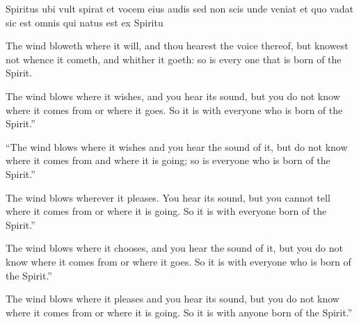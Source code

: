			\begin{framed}
			\scriptsize
				\begin{compactdesc}
					\item[SBLG]  \hyperref[PNEUMA]{} 
					\item[BSV] Spiritus ubi vult spirat et vocem eius audis sed non scis unde veniat et quo vadat sic est omnis qui natus est ex Spiritu
					\item[ASV] The wind bloweth where it will, and thou hearest the voice thereof, but knowest not whence it cometh, and whither it goeth: so is every one that is born of the Spirit.
					\item[ESV] The wind blows where it wishes, and you hear its sound, but you do not know where it comes from or where it goes. So it is with everyone who is born of the Spirit.''
					\item[NASB] ``The wind blows where it wishes and you hear the sound of it, but do not know where it comes from and where it is going; so is everyone who is born of the Spirit.''
					\item[NIV] The wind blows wherever it pleases. You hear its sound, but you cannot tell where it comes from or where it is going. So it is with everyone born of the Spirit.''
					\item[NRSV] The wind blows where it chooses, and you hear the sound of it, but you do not know where it comes from or where it goes. So it is with everyone who is born of the Spirit.''
					\item[SPNT] The wind blows where it pleases and you hear its sound, but you do not know where it comes from or where it is going. So it is with anyone born of the Spirit.''
				\end{compactdesc}
			\end{framed}

